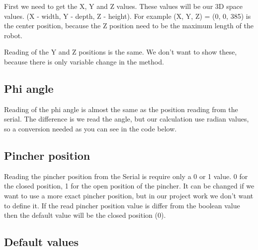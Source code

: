 			\hspace{15pt}First we need to get the X, Y and Z values. These values will be our 3D space values. (X - width, Y - depth, Z - height).
			For example (X, Y, Z) = (0, 0, 385) is the center position, because the Z position need to be the maximum length of the robot.
			
			
			
			\hspace{15pt}Reading of the Y and Z positions is the same. We don't want to show these, because there is only variable change in the method.
			
		\subsection{Phi angle}
		
			\hspace{15pt}Reading of the phi angle is almost the same as the position reading from the serial. The difference is we read the angle, but our calculation use radian values, so a conversion needed as you can see in the code below.
			
			
			
		\subsection{Pincher position}
		
			\hspace{15pt}Reading the pincher position from the Serial is require only a 0 or 1 value. 0 for the closed position, 1 for the open position of the pincher. It can be changed if we want to use a more exact pincher position, but in our project work we don't want to define it. If the read pincher position value is differ from the boolean value then the default value will be the closed position (0).
			
			
		
		\subsection{Default values}
			
